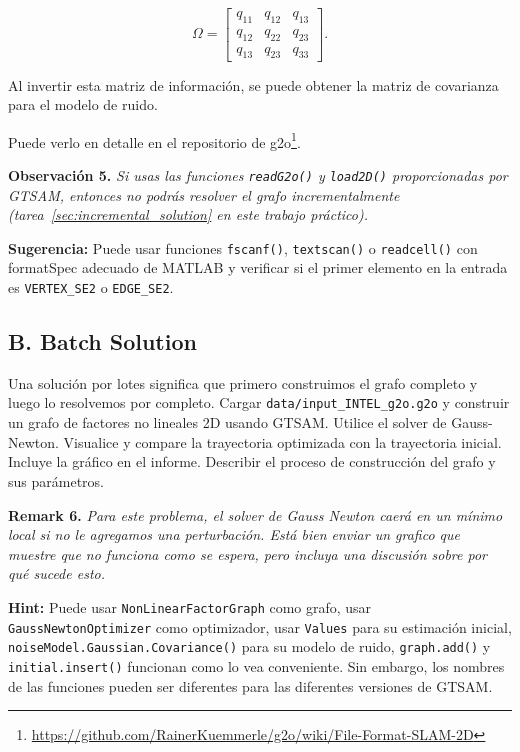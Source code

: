 \documentclass[tp]{lcc}
\begin{document}
\begin{equation*}
    \Omega = \begin{bmatrix} q_{11} & q_{12} & q_{13} \\ q_{12} & q_{22} & q_{23} \\ q_{13} & q_{23} & q_{33} \end{bmatrix}.
\end{equation*}

Al invertir esta matriz de información, se puede obtener la matriz de covarianza para el modelo de ruido.

Puede verlo en detalle en el repositorio de g2o\footnote{\url{https://github.com/RainerKuemmerle/g2o/wiki/File-Format-SLAM-2D}}.

\textbf{Observación 5.} \textit{Si usas las funciones \lstinline[style=bash]{readG2o()} y \lstinline[style=bash]{load2D()} proporcionadas por GTSAM, entonces no podrás resolver el grafo incrementalmente (tarea~\ref{sec:incremental_solution} en este trabajo práctico).}

\textbf{Sugerencia:} Puede usar funciones \lstinline[style=bash]{fscanf()}, \lstinline[style=bash]{textscan()} o \lstinline[style=bash]{readcell()} con formatSpec adecuado de MATLAB y verificar si el primer elemento en la entrada es \lstinline[style=bash]{VERTEX_SE2} o \lstinline[style=bash]{EDGE_SE2}.

\subsection{B. Batch Solution}
Una solución por lotes significa que primero construimos el grafo completo y luego lo resolvemos por completo. Cargar \lstinline[style=bash]{data/input_INTEL_g2o.g2o} y construir un grafo de factores no lineales 2D usando GTSAM. Utilice el solver de Gauss-Newton. Visualice y compare la trayectoria optimizada con la trayectoria inicial. Incluye la gráfico en el informe. Describir el proceso de construcción del grafo y sus parámetros.

\textbf{Remark 6.} \textit{Para este problema, el solver de Gauss Newton caerá en un mínimo local si no le agregamos una perturbación. Está bien enviar un grafico que muestre que no funciona como se espera, pero incluya una discusión sobre por qué sucede esto.}

\textbf{Hint:} Puede usar \lstinline[style=bash]{NonLinearFactorGraph} como grafo, usar \lstinline[style=bash]{GaussNewtonOptimizer} como optimizador, usar \lstinline[style=bash]{Values} para su estimación inicial, \lstinline[style=bash]{noiseModel.Gaussian.Covariance()} para su modelo de ruido, \lstinline[style=bash]{graph.add()} y \lstinline[style=bash]{initial.insert()} funcionan como lo vea conveniente. Sin embargo, los nombres de las funciones pueden ser diferentes para las diferentes versiones de GTSAM.
\end{document}
